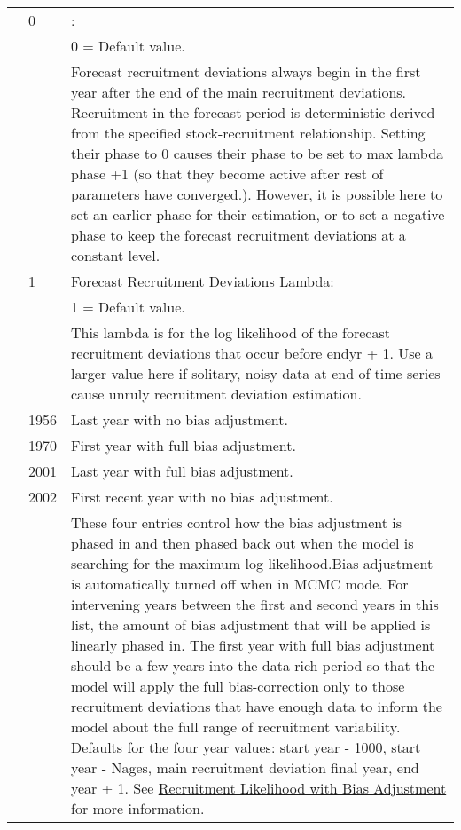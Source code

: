 \begin{longtable}{p{1cm} p{3cm} p{11cm}}
	\Tstrut & 0 & \raisebox{0.1\ht\strutbox}{\hypertarget{FcastRecDevPhase}{Forecast Recruitment Deviations Phase}}: \\
			&   & 0 = Default value. \\
			&   & Forecast recruitment deviations always begin in the first year after the end of the main recruitment deviations. Recruitment in the forecast period is deterministic derived from the specified stock-recruitment relationship. Setting their phase to 0 causes their phase to be set to max lambda phase +1 (so that they become active after rest of parameters have converged.). However, it is possible here to set an earlier phase for their estimation, or to set a negative phase to keep the forecast recruitment deviations at a constant level. \Bstrut\\

	\Tstrut & 1 & Forecast Recruitment Deviations Lambda: \\
			&   & 1 = Default value. \\
			&   & This lambda is for the log likelihood of the forecast recruitment deviations that occur before endyr + 1. Use a larger value here if solitary, noisy data at end of time series cause unruly recruitment deviation estimation. \\
	
	\Tstrut & 1956 & Last year with no bias adjustment. \\
			& 1970 & First year with full bias adjustment. \\
			& 2001 & Last year with full bias adjustment. \\
			& 2002 & First recent year with no bias adjustment. \\
			& 	   & These four entries control how the bias adjustment is phased in and then phased back out when the model is searching for the maximum log likelihood.Bias adjustment is automatically turned off when in MCMC mode. For intervening years between the first and second years in this list, the amount of bias adjustment that will be applied is linearly phased in. The first year with full bias adjustment should be a few years into the data-rich period so that the model will apply the full bias-correction only to those recruitment deviations that have enough data to inform the model about the full range of recruitment variability. Defaults for the four year values: start year - 1000, start year - Nages, main recruitment deviation final year, end year + 1. See \hyperlink{RecBias}{Recruitment Likelihood with Bias Adjustment} for more information. \\
	

\end{longtable}
